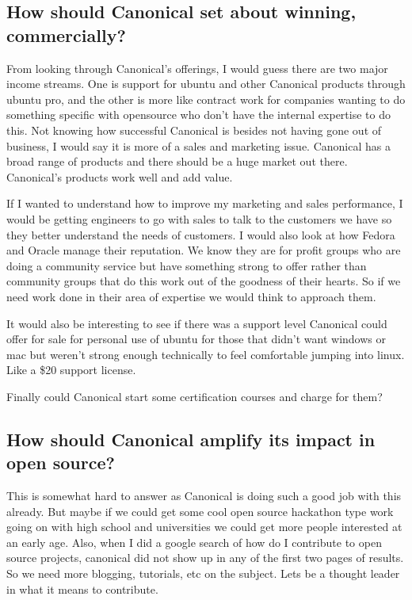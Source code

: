 \documentclass[letter,12pt]{article}
\begin{document}
\subsection{How should Canonical set about winning, commercially?}
From looking through Canonical's offerings, I would guess there are two major income streams. One is support for ubuntu and other Canonical products through ubuntu pro, and the other is more like contract work for companies wanting to do something specific with opensource who don't have the internal expertise to do this. Not knowing how successful Canonical is besides not having gone out of business, I would say it is more of a sales and marketing issue. Canonical has a broad range of products and there should be a huge market out there. Canonical's products work well and add value.

If I wanted to understand how to improve my marketing and sales performance, I would be getting engineers to go with sales to talk to the customers we have so they better understand the needs of customers. I would also look at how Fedora and Oracle manage their reputation. We know they are for profit groups who are doing a community service but have something strong to offer rather than community groups that do this work out of the goodness of their hearts. So if we need work done in their area of expertise we would think to approach them.

It would also be interesting to see if there was a support level Canonical could offer for sale for personal use of ubuntu for those that didn't want windows or mac but weren't strong enough technically to feel comfortable jumping into linux. Like a \$20 support license.

Finally could Canonical start some certification courses and charge for them?

\subsection{How should Canonical amplify its impact in open source?}
This is somewhat hard to answer as Canonical is doing such a good job with this already. But maybe if we could get some cool open source hackathon type work going on with high school and universities we could get more people interested at an early age. Also, when I did a google search of how do I contribute to open source projects, canonical did not show up in any of the first two pages of results. So we need more blogging, tutorials, etc on the subject. Lets be a thought leader in what it means to contribute.
\end{document}
